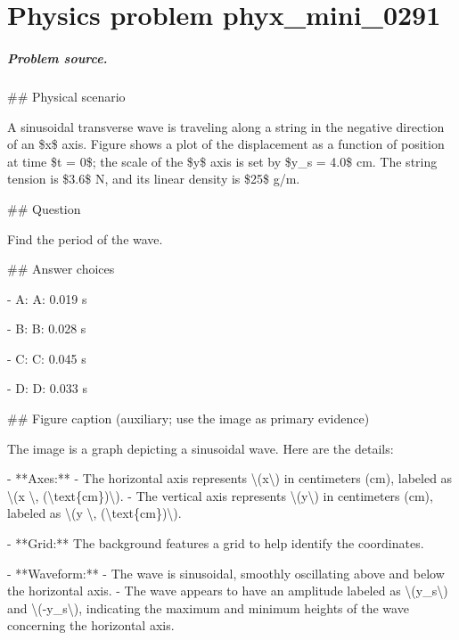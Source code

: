 
\chapter{Physics problem phyx\_mini\_0291}
\label{ch:PhyXMiniProblems_problem_phyx_mini_0291}

\paragraph{Problem source.}
\#\# Physical scenario

A sinusoidal transverse wave is traveling along a string in the negative direction of an \$x\$ axis. Figure shows a plot of the displacement as a function of position at time \$t = 0\$; the scale of the \$y\$ axis is set by \$y\_s = 4.0\$ cm. The string tension is \$3.6\$ N, and its linear density is \$25\$ g/m.

\#\# Question

Find the period of the wave.

\#\# Answer choices

- A: A: 0.019 s

- B: B: 0.028 s

- C: C: 0.045 s

- D: D: 0.033 s

\#\# Figure caption (auxiliary; use the image as primary evidence)

The image is a graph depicting a sinusoidal wave. Here are the details:

- **Axes:** 
  - The horizontal axis represents \textbackslash{}(x\textbackslash{}) in centimeters (cm), labeled as \textbackslash{}(x \textbackslash{}, (\textbackslash{}text\{cm\})\textbackslash{}).
  - The vertical axis represents \textbackslash{}(y\textbackslash{}) in centimeters (cm), labeled as \textbackslash{}(y \textbackslash{}, (\textbackslash{}text\{cm\})\textbackslash{}).

- **Grid:** The background features a grid to help identify the coordinates.

- **Waveform:** 
  - The wave is sinusoidal, smoothly oscillating above and below the horizontal axis.
  - The wave appears to have an amplitude labeled as \textbackslash{}(y\_s\textbackslash{}) and \textbackslash{}(-y\_s\textbackslash{}), indicating the maximum and minimum heights of the wave concerning the horizontal axis.

